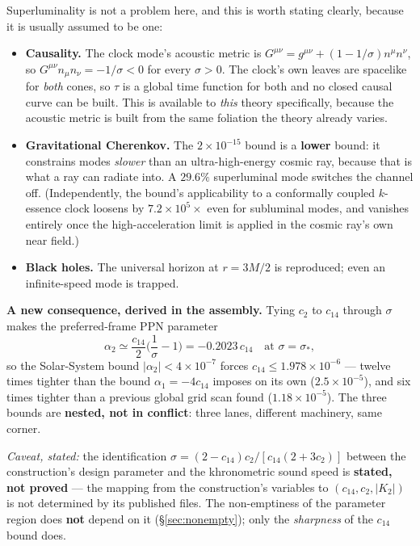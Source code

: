 \documentclass[11pt,letterpaper]{article}
\begin{document}
Superluminality is not a problem here, and this is worth stating clearly, because it is usually assumed to be one:
\begin{itemize}
\item \textbf{Causality.} The clock mode's acoustic metric is $G^{\mu\nu}=g^{\mu\nu}+(1-1/\sigma)n^\mu n^\nu$, so $G^{\mu\nu}n_\mu n_\nu=-1/\sigma<0$ for every $\sigma>0$. The clock's own leaves are spacelike for \emph{both} cones, so $\tau$ is a global time function for both and no closed causal curve can be built. This is available to \emph{this} theory specifically, because the acoustic metric is built from the same foliation the theory already varies.
\item \textbf{Gravitational Cherenkov.} The $2\times10^{-15}$ bound \cite{moore01,cherenkov} is a \textbf{lower} bound: it constrains modes \emph{slower} than an ultra-high-energy cosmic ray, because that is what a ray can radiate into. A $29.6\%$ superluminal mode switches the channel off. (Independently, the bound's applicability to a conformally coupled $k$-essence clock loosens by $7.2\times10^{5}\times$ even for subluminal modes, and vanishes entirely once the high-acceleration limit \cite{milgrom11} is applied in the cosmic ray's own near field.)
\item \textbf{Black holes.} The universal horizon at $r=3M/2$ is reproduced; even an infinite-speed mode is trapped.
\end{itemize}

\textbf{A new consequence, derived in the assembly.} Tying $c_2$ to $c_{14}$ through $\sigma$ makes the preferred-frame PPN parameter
\begin{equation}
\alpha_2\simeq\frac{c_{14}}{2}\Big(\frac1\sigma-1\Big)=-0.2023\,c_{14}\quad\text{at }\sigma=\sigma_*,
\end{equation}
so the Solar-System bound $|\alpha_2|<4\times10^{-7}$ \cite{will14} forces \textbf{$c_{14}\le1.978\times10^{-6}$} --- twelve times tighter than the bound $\alpha_1=-4c_{14}$ imposes on its own ($2.5\times10^{-5}$), and six times tighter than a previous global grid scan found ($1.18\times10^{-5}$). The three bounds are \textbf{nested, not in conflict}: three lanes, different machinery, same corner.

\emph{Caveat, stated:} the identification $\sigma=(2-c_{14})c_2/[c_{14}(2+3c_2)]$ between the construction's design parameter and the khronometric sound speed is \textbf{stated, not proved} --- the mapping from the construction's variables to $(c_{14},c_2,|K_2|)$ is not determined by its published files. The non-emptiness of the parameter region does \textbf{not} depend on it (\S\ref{sec:nonempty}); only the \emph{sharpness} of the $c_{14}$ bound does.
\end{document}
